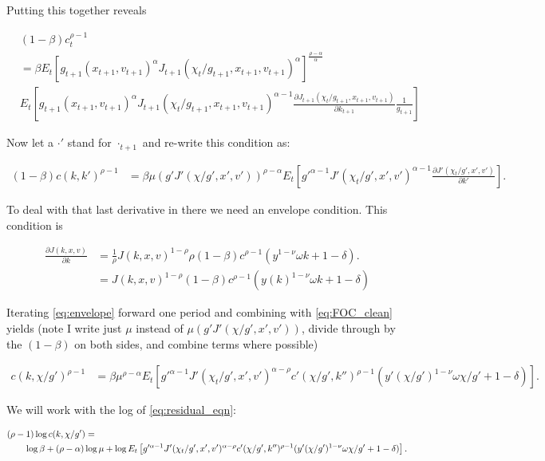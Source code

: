\documentclass[10pt]{article}
\newcommand{\fracpd}[2]{
  \ensuremath{\frac{\partial #1}{\partial #2}}
}
\begin{document}
Putting this together reveals

\begin{align*}
  &(1 - \beta) c_{t}^{\rho - 1} \\&= \beta E_t \left[ g_{t+1}(x_{t+1}, v_{t+1})^{\alpha} J_{t+1}(\chi_t/g_{t+1}, x_{t+1}, v_{t+1})^{\alpha} \right]^{\frac{\rho - \alpha}{\alpha}} \\&E_t \left[ g_{t+1}(x_{t+1}, v_{t+1})^{\alpha} J_{t+1}(\chi_t/g_{t+1}, x_{t+1}, v_{t+1})^{\alpha - 1} \fracpd{J_{t+1}(\chi_t/g_{t+1}, x_{t+1}, v_{t+1})}{k_{t+1}} \frac{1}{g_{t+1}} \right]
\end{align*}

Now let a $\cdot'$ stand for  $\cdot_{t+1}$ and re-write this condition as:

\begin{align} \label{eq:FOC_clean}
  (1 - \beta) c(k,k')^{\rho - 1} &= \beta \mu\left(g'J'(\chi/g',x',v')\right)^{\rho- \alpha}E_t \left[ g'^{\alpha-1} J'(\chi_t/g', x', v')^{\alpha - 1} \fracpd{J'(\chi_t/g', x', v')}{k'} \right].
\end{align}

To deal with that last derivative in there we need an envelope condition. This condition is

\begin{align} \label{eq:envelope}
  \fracpd{J(k,x,v)}{k} &= \frac{1}{\rho} J(k,x,v)^{1 - \rho} \rho (1 - \beta) c^{\rho - 1} (y^{1 - \nu} \omega k + 1 - \delta). \\
  &= J(k,x,v)^{1 - \rho} (1 - \beta) c^{\rho - 1} (y(k)^{1 - \nu} \omega k + 1 - \delta)
\end{align}

Iterating \eqref{eq:envelope} forward one period and combining with \eqref{eq:FOC_clean} yields (note I write just $\mu$ instead of $\mu(g' J'(\chi/g', x', v'))$, divide through by the $(1-\beta)$ on both sides, and combine terms where possible)

\begin{align} \label{eq:residual_eqn}
  c(k,\chi/g')^{\rho - 1} &= \beta \mu^{\rho- \alpha}E_t \left[ g'^{\alpha-1} J'(\chi_t/g', x', v')^{\alpha - \rho} c'(\chi/g',k'')^{\rho - 1} (y'(\chi/g')^{1 - \nu} \omega \chi/g' + 1 - \delta)  \right].
\end{align}

We will work with the log of \eqref{eq:residual_eqn}:

\begin{align} \label{eq:log_residual_eqn}
  &(\rho - 1)\log c(k,\chi/g') = \notag \\
  & \qquad  \log \beta + (\rho-  \alpha) \log \mu + \log E_t \left[ g'^{\alpha-1} J'(\chi_t/g', x', v')^{\alpha - \rho} c'(\chi/g',k'')^{\rho - 1} (y'(\chi/g')^{1 - \nu} \omega \chi/g' + 1 - \delta)  \right].
\end{align}
\end{document}
